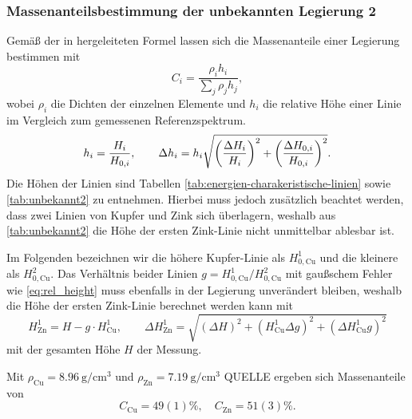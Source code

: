 \subsubsection*{Massenanteilsbestimmung der unbekannten Legierung 2}\label{subsubsec:massenanteile}
Gemäß der in \cite{skript} hergeleiteten Formel lassen sich die Massenanteile einer Legierung bestimmen mit 
\begin{equation}
    C_i = \frac{\rho_ih_i}{\sum_j\rho_j h_j},
\end{equation}
wobei $\rho_i$ die Dichten der einzelnen Elemente und $h_i$ die relative Höhe einer Linie 
im Vergleich zum gemessenen Referenzspektrum. 
\begin{equation}
    h_i = \frac{H_i}{H_{0, i}},\qquad \Delta h_i = h_i\sqrt{\qty(\frac{\Delta H_i}{H_i})^2 + \qty(\frac{\Delta H_{0, i}}{H_{0, i}})^2}.
    \label{eq:rel_height}
\end{equation}
Die Höhen der Linien sind Tabellen \ref{tab:energien-charakeristische-linien} sowie \ref{tab:unbekannt2} zu entnehmen.
Hierbei muss jedoch zusätzlich beachtet werden, dass zwei Linien von Kupfer und Zink sich überlagern,
weshalb aus \cref{tab:unbekannt2} die Höhe der ersten Zink-Linie nicht unmittelbar ablesbar ist.\par 
Im Folgenden bezeichnen wir die höhere Kupfer-Linie als $H^1_{0, \mathrm{Cu}}$ und die kleinere als $H^2_{0, \mathrm{Cu}}$.
Das Verhältnis beider Linien $g = H^1_{0, \mathrm{Cu}} / H^2_{0, \mathrm{Cu}}$ mit gaußschem Fehler wie \ref{eq:rel_height} muss ebenfalls 
in der Legierung unverändert bleiben, weshalb die Höhe der ersten Zink-Linie berechnet werden kann mit 
\begin{equation*}
    H^1_\mathrm{Zn} = H - g\cdot H^1_\mathrm{Cu}, \qquad 
    \Delta H^1_\mathrm{Zn} = \sqrt{(\Delta H)^2 + ( H^1_\mathrm{Cu}\Delta g)^2 + (\Delta  H^1_\mathrm{Cu} g)^2}
\end{equation*}
mit der gesamten Höhe $H$ der Messung.\par 
Mit $\rho_\mathrm{Cu} =\SI{8.96}{\gram\per\cubic\cm}$ und $\rho_\mathrm{Zn} =\SI{7.19}{\gram\per\cubic\cm}$ QUELLE 
ergeben sich Massenanteile von 
\begin{equation}
    C_\mathrm{Cu} = 49(1)\%,\quad C_\mathrm{Zn} = 51(3)\%.
\end{equation}

